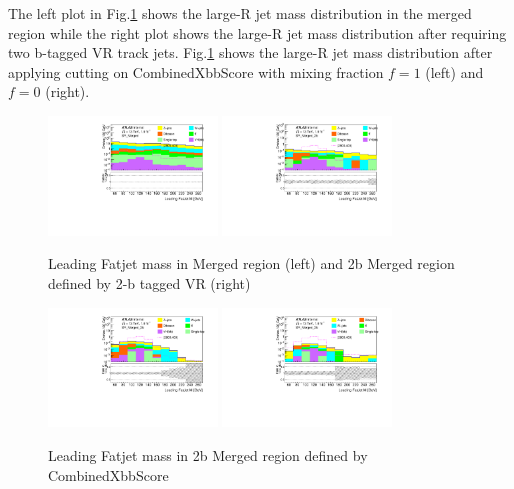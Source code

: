\par The left plot in Fig.\ref{fig:mj_before} shows the large-R jet mass distribution in the merged region while the right plot shows the large-R jet mass distribution after requiring two b-tagged VR track jets. 
Fig.\ref{fig:mj_before} shows the large-R jet mass distribution after applying cutting on CombinedXbbScore with mixing fraction $f=1$ (left) and $f=0$ (right).     

\begin{figure}[h]
    \centering
    \includegraphics[width=0.4\textwidth]{appendices/figures/MC_MonoH_Nominal_SR_Merged_fatjets_m1_20GeV_LogY.pdf}
    \includegraphics[width=0.4\textwidth]{appendices/figures/MC_MonoH_Nominal_SR_Merged_2b_fatjets_m1_20GeV_LogY_vr.pdf}
    \caption{Leading Fatjet mass in Merged region (left) and 2b Merged region defined by 2-b tagged VR (right)}
    \label{fig:mj_before}
\end{figure}

\begin{figure}[h]
    \centering
    \includegraphics[width=0.4\textwidth]{appendices/figures/MC_MonoH_Nominal_SR_Merged_2b_fatjets_m1_20GeV_LogY_xbb.pdf}
    \includegraphics[width=0.4\textwidth]{appendices/figures/MC_MonoH_Nominal_SR_Merged_2b_fatjets_m1_20GeV_LogY_xbb_f0.pdf}
    \caption{Leading Fatjet mass in 2b Merged region defined by CombinedXbbScore}
    \label{fig:mj_after}
\end{figure}

